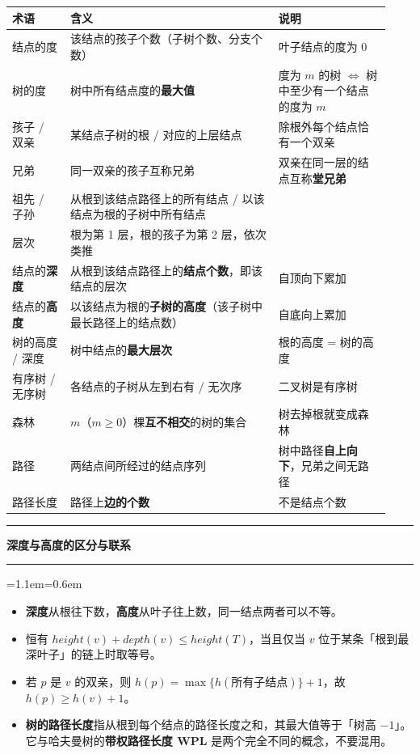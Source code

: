 \documentclass[11pt,openany,UTF8]{ctexbook}
\newcommand{\callouthead}[2]{%
  \par\addvspace{7pt}\noindent
  {\color{#1}\rule[-0.15em]{3pt}{1.05em}}\hspace{0.5em}%
  {\bfseries\color{#1}#2}\par\nobreak\vspace{-0.35em}%
  {\color{rulesep}\hrule height 0.4pt}\nobreak\vspace{0.45em}%
  \begingroup\small\setlength{\parindent}{0pt}%
  \leftskip=1.1em\rightskip=0.6em\noindent\ignorespaces}
\newcommand{\calloutend}{\par\endgroup\addvspace{7pt}}
\newenvironment{callkey}[1]{\callouthead{keybar}{#1}}{\calloutend}
\begin{document}
\begingroup\small\setlength{\tabcolsep}{4.0pt}
\begin{longtable}{@{}L{0.1457\linewidth}L{0.5030\linewidth}L{0.2798\linewidth}@{}}
\toprule
\textbf{术语} & \textbf{含义} & \textbf{说明} \\
\midrule
\endhead
结点的度 & 该结点的孩子个数（子树个数、分支个数） & 叶子结点的度为 0 \\
树的度 & 树中所有结点度的\textbf{最大值} & 度为 $m$ 的树 $\Leftrightarrow$ 树中至少有一个结点的度为 $m$ \\
孩子 / 双亲 & 某结点子树的根 / 对应的上层结点 & 除根外每个结点恰有一个双亲 \\
兄弟 & 同一双亲的孩子互称兄弟 & 双亲在同一层的结点互称\textbf{堂兄弟} \\
祖先 / 子孙 & 从根到该结点路径上的所有结点 / 以该结点为根的子树中所有结点 &  \\
层次 & 根为第 1 层，根的孩子为第 2 层，依次类推 &  \\
结点的\textbf{深度} & 从根到该结点路径上的\textbf{结点个数}，即该结点的层次 & 自顶向下累加 \\
结点的\textbf{高度} & 以该结点为根的\textbf{子树的高度}（该子树中最长路径上的结点数） & 自底向上累加 \\
树的高度 / 深度 & 树中结点的\textbf{最大层次} & 根的高度 = 树的高度 \\
有序树 / 无序树 & 各结点的子树从左到右有 / 无次序 & 二叉树是有序树 \\
森林 & $m$（$m\ge 0$）棵\textbf{互不相交}的树的集合 & 树去掉根就变成森林 \\
路径 & 两结点间所经过的结点序列 & 树中路径\textbf{自上向下}，兄弟之间无路径 \\
路径长度 & 路径上\textbf{边的个数} & 不是结点个数 \\
\bottomrule
\end{longtable}
\endgroup

\begin{callkey}{深度与高度的区分与联系}
\begin{itemize}
\item \textbf{深度}从根往下数，\textbf{高度}从叶子往上数，同一结点两者可以不等。
\item 恒有 $height(v)+depth(v)\le height(T)$，当且仅当 $v$ 位于某条「根到最深叶子」的链上时取等号。
\item 若 $p$ 是 $v$ 的双亲，则 $h(p)=\max\{h(\text{所有子结点})\}+1$，故 $h(p)\ge h(v)+1$。
\item \textbf{树的路径长度}指从根到每个结点的路径长度之和，其最大值等于「树高 $-1$」。它与哈夫曼树的\textbf{带权路径长度 WPL} 是两个完全不同的概念，不要混用。
\end{itemize}
\end{callkey}
\end{document}
